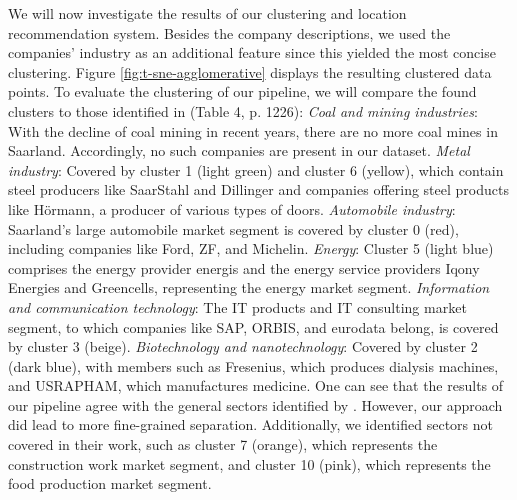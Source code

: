\documentclass[12pt]{article}
\begin{document}
   We will now investigate the results of our clustering and location recommendation system. Besides the company descriptions, we used the companies' industry as an additional feature since this yielded the most concise clustering. Figure \ref{fig:t-sne-agglomerative} displays the resulting clustered data points.
   To evaluate  the clustering of our pipeline, we will compare the found clusters to those identified in \cite{saarlandeco2} (Table 4, p. 1226):
   \textit{Coal and mining industries}: With the decline of coal mining in recent years, there are no more coal mines in Saarland. Accordingly, no such companies are present in our dataset.    
   \textit{Metal industry}: Covered by cluster 1 (light green) and cluster 6 (yellow), which contain steel producers like SaarStahl and Dillinger and companies offering steel products like Hörmann, a producer of various types of doors.    
   \textit{Automobile industry}: Saarland's large automobile market segment is covered by cluster 0 (red), including companies like Ford, ZF, and Michelin.    
   \textit{Energy}: Cluster 5 (light blue) comprises the energy provider energis and the energy service providers Iqony Energies and Greencells, representing the energy market segment.    
   \textit{Information and communication technology}: The IT products and IT consulting market segment, to which companies like SAP, ORBIS, and eurodata belong, is covered by cluster 3 (beige).    
   \textit{Biotechnology and nanotechnology}: Covered by cluster 2 (dark blue), with members such as Fresenius, which produces dialysis machines, and USRAPHAM, which manufactures medicine.        
   One can see that the results of our pipeline agree with the general sectors identified by \cite{saarlandeco2}. However, our approach did lead to more fine-grained separation. Additionally, we identified sectors not covered in their work, such as cluster 7 (orange), which represents the construction work market segment, and cluster 10 (pink), which represents the food production market segment.
   
\end{document}
